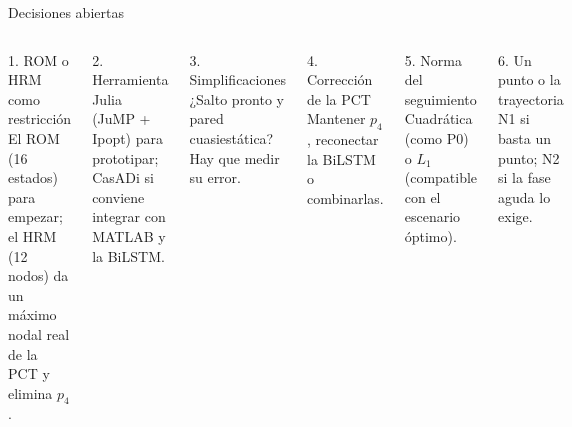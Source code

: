 \documentclass[aspectratio=169,10pt]{beamer}
\begin{document}
\begin{frame}{Decisiones abiertas}
\begin{columns}[T]
\small
\begin{block}{1. ROM o HRM como restricción}
El ROM (16 estados) para empezar; el HRM (12 nodos) da un máximo nodal real de la PCT y elimina $p_4$.
\end{block}
\begin{block}{2. Herramienta}
Julia (JuMP + Ipopt) para prototipar; CasADi si conviene integrar con MATLAB y la BiLSTM.
\end{block}
\begin{block}{3. Simplificaciones}
¿Salto pronto y pared cuasiestática? Hay que medir su error.
\end{block}
\small
\begin{block}{4. Corrección de la PCT}
Mantener $p_4$, reconectar la BiLSTM o combinarlas.
\end{block}
\begin{block}{5. Norma del seguimiento}
Cuadrática (como P0) o $L_1$ (compatible con el escenario óptimo).
\end{block}
\begin{block}{6. Un punto o la trayectoria}
N1 si basta un punto; N2 si la fase aguda lo exige.
\end{block}
\end{columns}
\end{frame}
\end{document}

